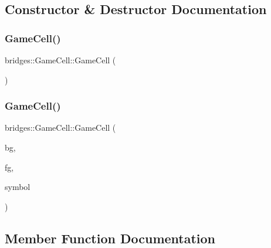 \subsection{Constructor \& Destructor Documentation}
\mbox{\label{classbridges_1_1_game_cell_ad498aad8d6cb4d3e956f19071a8ae201}} 
\subsubsection{\texorpdfstring{GameCell()}{GameCell()}\hspace{0.1cm}{\footnotesize\ttfamily [1/2]}}
{\footnotesize\ttfamily bridges\+::\+Game\+Cell\+::\+Game\+Cell (\begin{DoxyParamCaption}{ }\end{DoxyParamCaption})\hspace{0.3cm}{\ttfamily [inline]}}

\mbox{\label{classbridges_1_1_game_cell_a5c6b1800cd495ef394112eecaf76eb16}} 
\subsubsection{\texorpdfstring{GameCell()}{GameCell()}\hspace{0.1cm}{\footnotesize\ttfamily [2/2]}}
{\footnotesize\ttfamily bridges\+::\+Game\+Cell\+::\+Game\+Cell (\begin{DoxyParamCaption}\item[{\mbox{\hyperlink{namespacebridges_ad811207d8898a7fd6b72a74725e68357}{Named\+Color}}}]{bg,  }\item[{\mbox{\hyperlink{namespacebridges_ad811207d8898a7fd6b72a74725e68357}{Named\+Color}}}]{fg,  }\item[{\mbox{\hyperlink{namespacebridges_acfb0a4f7877d8f63de3e6862004c50ed}{Named\+Symbol}}}]{symbol }\end{DoxyParamCaption})\hspace{0.3cm}{\ttfamily [inline]}}



\subsection{Member Function Documentation}
\mbox{\label{classbridges_1_1_game_cell_a781afb078bedaba909f124eddd543056}} 
